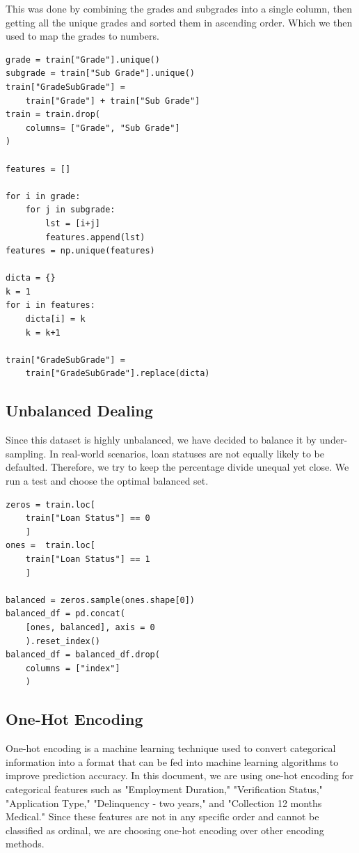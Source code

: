 \documentclass[sigplan]{acmart}
\begin{document}
This was done by combining the grades and subgrades into a single column, then getting all the unique grades and sorted them in ascending order.
Which we then used to map the grades to numbers.
\begin{verbatim}
grade = train["Grade"].unique()
subgrade = train["Sub Grade"].unique()
train["GradeSubGrade"] = 
    train["Grade"] + train["Sub Grade"]
train = train.drop(
    columns= ["Grade", "Sub Grade"]
)

features = []

for i in grade:
    for j in subgrade:
        lst = [i+j]
        features.append(lst)
features = np.unique(features)

dicta = {}
k = 1
for i in features:
    dicta[i] = k
    k = k+1

train["GradeSubGrade"] = 
    train["GradeSubGrade"].replace(dicta)
\end{verbatim}

\subsection{Unbalanced Dealing}
Since this dataset is highly unbalanced, we have decided to balance it by under-sampling. In real-world scenarios, loan statuses are not equally likely to be defaulted. Therefore, we try to keep the percentage divide unequal yet close. We run a test and choose the optimal balanced set.

\begin{verbatim}
zeros = train.loc[
    train["Loan Status"] == 0
    ]
ones =  train.loc[
    train["Loan Status"] == 1
    ]

balanced = zeros.sample(ones.shape[0])
balanced_df = pd.concat(
    [ones, balanced], axis = 0
    ).reset_index()
balanced_df = balanced_df.drop(
    columns = ["index"]
    )
\end{verbatim}

\subsection{One-Hot Encoding}
One-hot encoding is a machine learning technique used to convert categorical information into a format that can be fed into machine learning algorithms to improve prediction accuracy. In this document, we are using one-hot encoding for categorical features such as "Employment Duration," "Verification Status," "Application Type," "Delinquency - two years," and "Collection 12 months Medical." Since these features are not in any specific order and cannot be classified as ordinal, we are choosing one-hot encoding over other encoding methods.
\end{document}
